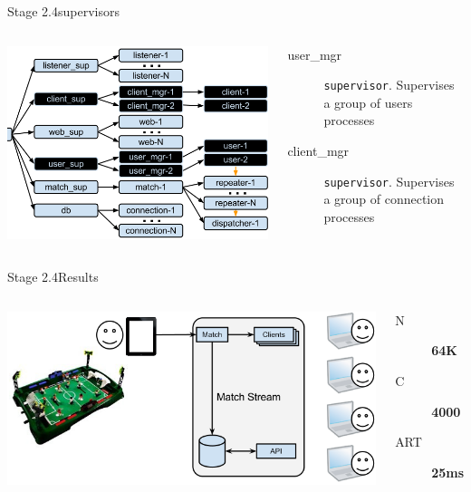 \documentclass[utf8]{beamer}
\begin{document}
\begin{frame}{Stage 2.4}{supervisors}
	\begin{columns}
			\begin{center}
				\includegraphics[height=.65\textheight]{img/architecture-3-4.png}
			\end{center}
			\begin{description}
				\item[user\_mgr]
					\texttt{supervisor}. Supervises a group of users processes
				\item[client\_mgr]
					\texttt{supervisor}. Supervises a group of connection processes
			\end{description}
	\end{columns}
\end{frame}
\begin{frame}{Stage 2.4}{Results}
	\begin{columns}
		\column{.66\textwidth}
			\includegraphics[top=-1,width=\textwidth]{img/results-1.png}
		\column{.33\textwidth}
			\begin{description}
				\item[N] \textbf{\Large 64K}
				\item[C] \textbf{\Large 4000}
				\item[ART] \textbf{\Large 25ms}
			\end{description}
	\end{columns}
\end{frame}
\end{document}
